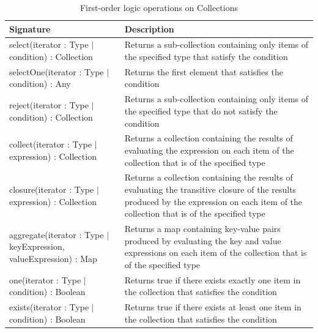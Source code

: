 \begin{longtable} {|p{5.5cm}|p{6.5cm}|}
			
			\caption{First-order logic operations on Collections}
			\label{tab:FirstOrderOperations}\\
			
			\hline
							
			\textbf{Signature} & \textbf{Description} \\\hline

			select(iterator : Type $|$ condition) : Collection & Returns a sub-collection containing only items of the specified type that satisfy the condition \\\hline 

			selectOne(iterator : Type $|$ condition) : Any & Returns the first element that satisfies the condition \\\hline
			
			reject(iterator : Type $|$ condition) : Collection & Returns a sub-collection containing only items of the specified type that do not satisfy the condition \\\hline
			
			collect(iterator : Type $|$ expression) : Collection &  Returns a collection containing the results of evaluating the expression on each item of the collection that is of the specified type \\\hline

                        closure(iterator : Type $|$ expression) : Collection & Returns a collection containing the results of evaluating the transitive closure of the results produced by the expression on each item of the collection that is of the specified type \\\hline

                        aggregate(iterator : Type $|$ keyExpression, valueExpression) : Map & Returns a map containing key-value pairs produced by evaluating the key and value expressions on each item of the collection that is of the specified type \\\hline

			one(iterator : Type $|$ condition) : Boolean & Returns true if there exists exactly one item in the collection that satisfies the condition \\\hline

			exists(iterator : Type $|$ condition) : Boolean & Returns true if there exists at least one item in the collection that satisfies the condition \\\hline
			

\end{longtable}
